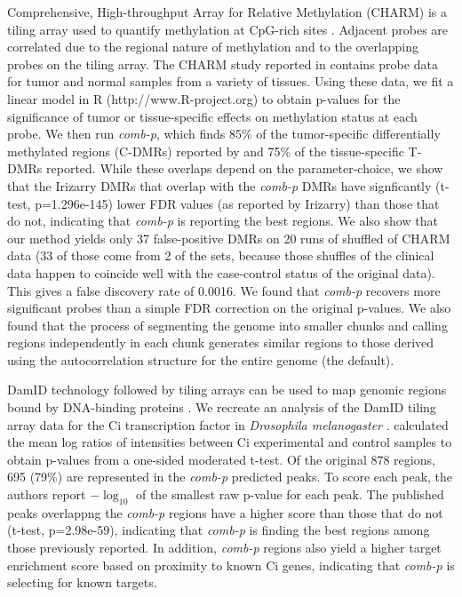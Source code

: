 \documentclass{bioinfo}
\begin{document}
\begin{methods}
Comprehensive, High-throughput Array for Relative Methylation (CHARM)
is a tiling array used to quantify methylation at CpG-rich sites
\citep{Irizarry2008}.  Adjacent probes are correlated
due to the regional nature of methylation and to the overlapping
probes on the tiling array.  The CHARM study reported in
\cite{Irizarry2009} contains probe data for tumor and normal samples
from a variety of tissues. Using these data, we fit a linear model in R
(http://www.R-project.org) to
obtain p-values for the significance of tumor or tissue-specific
effects on methylation status at each probe.  We then run
\textit{comb-p}, which finds 85\% of the tumor-specific differentially
methylated regions (C-DMRs) reported by \cite{Irizarry2009} and 75\% of
the tissue-specific T-DMRs reported.  While these overlaps depend on
the parameter-choice, we show that the Irizarry DMRs that overlap
with the \textit{comb-p} DMRs have signficantly (t-test,
p=1.296e-145) lower FDR values (as reported by Irizarry) than those
that do not, indicating that \textit{comb-p} is reporting the best regions.
We also show that our method yields only 37 false-positive DMRs on 20
runs of shuffled of CHARM data (33 of those come from 2 of the sets,
because those shuffles of the clinical data happen to coincide well
with the case-control status of the original data). This gives a false
discovery rate of 0.0016.
We found that \textit{comb-p} recovers more significant
probes than a simple FDR correction on the original p-values.
We also found that the process of segmenting the genome into smaller chunks and
calling regions independently in each chunk generates similar regions to those
derived using the autocorrelation structure for the entire genome (the default).


DamID technology followed by tiling arrays can be used to map genomic
regions bound by DNA-binding proteins \citep{Steensel2001}.  We
recreate an analysis of the DamID tiling array data for the Ci
transcription factor in {\it Drosophila melanogaster} \citep{Biehs}.
\cite{Kechris2010} calculated the
mean log ratios of intensities between Ci experimental and control
samples to obtain p-values from a one-sided moderated t-test.
Of the original 878 regions, 695 (79\%) are
represented in the \textit{comb-p} predicted peaks.  To score each
peak, the authors report $-\log_{10}$ of the smallest raw p-value for
each peak. The published peaks overlappng the \textit{comb-p} regions
have a higher score than those that do not (t-test, p=2.98e-59),
indicating that \textit{comb-p}
is finding the best regions among those previously reported.
In addition, \textit{comb-p} regions also yield a higher target enrichment
score based on proximity to known Ci genes, indicating that \textit{comb-p}
is selecting for known targets.


\end{methods}
\end{document}
